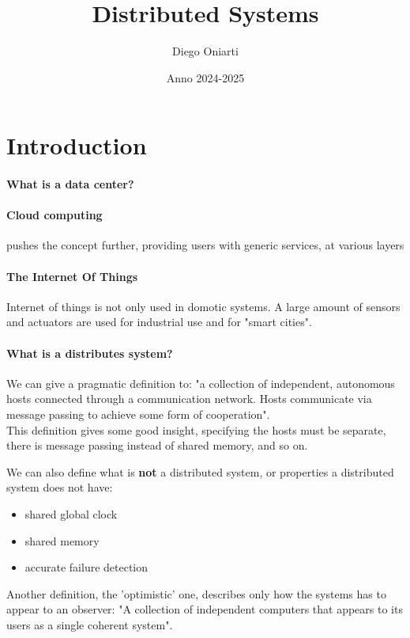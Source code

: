 \documentclass{article}
\title{Distributed Systems}
\author{Diego Oniarti}
\date{Anno 2024-2025}
\begin{document}
\maketitle
\tableofcontents

\newpage
\section{Introduction}

\paragraph{What is a data center?}

\paragraph{Cloud computing}
pushes the concept further, providing users with generic services, at various layers

\paragraph{The Internet Of Things}
Internet of things is not only used in domotic systems. A large amount of sensors and actuators are used for industrial use and for "smart cities".

\paragraph{What is a distributes system?}
We can give a pragmatic definition to: "a collection of independent, autonomous hosts connected through a communication network. Hosts communicate via message passing to achieve some form of cooperation".\\
This definition gives some good insight, specifying the hosts must be separate, there is message passing instead of shared memory, and so on.

We can also define what is \textbf{not} a distributed system, or properties a distributed system does not have:
\begin{itemize}
    \item shared global clock
    \item shared memory
    \item accurate failure detection
\end{itemize}

Another definition, the 'optimistic' one, describes only how the systems has to appear to an observer: "A collection of independent computers that appears to its users as a single coherent system".
\end{document}
